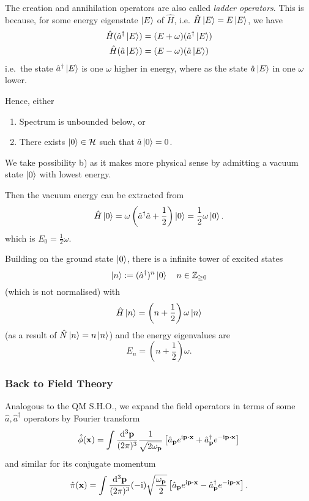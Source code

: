\documentclass[a4paper,11pt]{article}
\begin{document}
	The creation and annihilation operators are also called \emph{ladder operators}. This is because, for some energy eigenstate $\ket{E}$ of $\hat H$, i.e. $\hat H \ket{E} = E \ket{E}$, we have
	\begin{align*}
		\hat H (\hat a^\dagger \ket{E}) & = (E + \omega)(\hat a^\dagger \ket{E})\\
		\hat H (\hat a \ket{E}) & = (E - \omega)(\hat a \ket{E})\\
	\end{align*}
	i.e.\ the state $\hat a^\dagger \ket{E}$ is one $\omega$ higher in energy, where as the state $\hat a \ket{E}$ in one $\omega$ lower.
	
	Hence, either
	\begin{enumerate}
		\item Spectrum is unbounded below, or
		\item There exists $\ket{0}\in \mathcal{H}$ such that $\hat a \ket{0}=0$.
	\end{enumerate}

	We take possibility b) as it makes more physical sense by admitting a vacuum state $\ket{0}$ with lowest energy.

	Then the vacuum energy can be extracted from
	\[
		\hat H \ket{0} = \omega \left( \hat a^\dagger \hat a + \frac{1}{2}\right) \ket{0} = \frac{1}{2} \omega \ket{0}.
	\]
	which is $E_0 = \frac{1}{2} \omega$.

	Building on the ground state $\ket{0}$, there is a infinite tower of excited states
	\[
		\ket{n} := (\hat a^\dagger)^n \ket{0} \quad n \in \mathbb{Z}_{\geq 0}
	\]
	(which is not normalised) with
	\[
		\hat H \ket{n} = \left( n + \frac{1}{2} \right) \omega \ket{n}
	\]
	(as a result of $\hat N \ket{n} = n \ket{n}$) and the energy eigenvalues are
	\[
		E_n = \left( n + \frac{1}{2} \right) \omega.
	\]
	
	\subsubsection{Back to Field Theory}
	
	Analogous to the QM S.H.O., we expand the field operators in terms of some $\hat a, \hat a^\dagger$ operators by Fourier transform
	\begin{equation}
		\hat \phi (\vb x) = \int \ddk{\vb p}{3} \frac{1}{\sqrt{2 \omega _{\vb p}}} \left[ \hat a _{\vb p} e ^{\mathrm{i} \vb p \vdot \vb x} + \hat a^\dagger _{\vb p} e ^{-\mathrm{i} \vb p \vdot \vb x} \right]
	\end{equation}
	and similar for its conjugate momentum
	\begin{equation}
		\hat \pi (\vb x) = \int \ddk{\vb p}{3} (-\mathrm{i}) \sqrt{\frac{\omega _{\vb p}}{2}} \left[ \hat a _{\vb p} e ^{\mathrm{i} \vb p \vdot \vb x} - \hat a^\dagger _{\vb p} e ^{-\mathrm{i} \vb p \vdot \vb x} \right].
	\end{equation}
\end{document}

